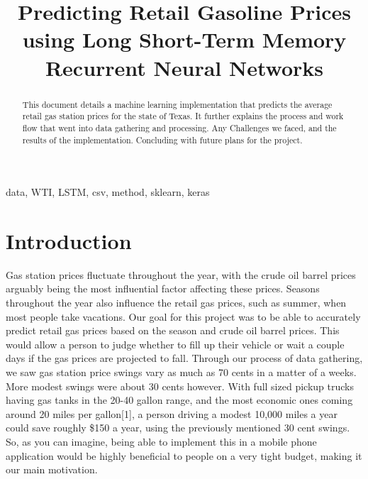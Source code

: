 \documentclass[conference]{IEEEtran}
\begin{document}
\title{Predicting Retail Gasoline Prices using Long Short-Term Memory Recurrent Neural Networks\\
}

\author{
\and
{}
}

\maketitle

\begin{abstract}
This document details a machine learning implementation that predicts the average retail gas station prices for the state of Texas. It further explains the process and work flow that went into data gathering and processing. Any Challenges we faced, and the results of the implementation. Concluding with future plans for the project.
\end{abstract}

\begin{IEEEkeywords}
data, WTI, LSTM, csv, method, sklearn, keras
\end{IEEEkeywords}

\section{Introduction}

Gas station prices fluctuate throughout the year, with the crude oil barrel prices arguably being the most influential factor affecting these prices. Seasons throughout the year also influence the retail gas prices, such as summer, when most people take vacations. Our goal for this project was to be able to accurately predict retail gas prices based on the season and crude oil barrel prices. This would allow a person to judge whether to fill up their vehicle or wait a couple days if the gas prices are projected to fall. Through our process of data gathering, we saw gas station price swings vary as much as 70 cents in a matter of a weeks. More modest swings were about 30 cents however. With full sized pickup trucks having gas tanks in the 20-40 gallon range, and the most economic ones coming around 20 miles per gallon[1], a person driving a modest 10,000 miles a year could save roughly \$150 a year, using the previously mentioned 30 cent swings. So, as you can imagine, being able to implement this in a mobile phone application would be highly beneficial to people on a very tight budget, making it our main motivation. 
\end{document}
